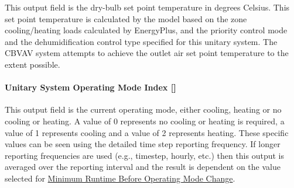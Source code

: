 This output field is the dry-bulb set point temperature in degrees Celsius. This set point temperature is calculated by the model based on the zone cooling/heating loads calculated by EnergyPlus, and the priority control mode and the dehumidification control type specified for this unitary system. The CBVAV system attempts to achieve the outlet air set point temperature to the extent possible.

\paragraph{Unitary System Operating Mode Index {[]}}\label{unitary-system-operating-mode-index}

This output field is the current operating mode, either cooling, heating or no cooling or heating.  A value of 0 represents no cooling or heating is required, a value of 1 represents cooling and a value of 2 represents heating. These specific values can be seen using the detailed time step reporting frequency. If longer reporting frequencies are used (e.g., timestep, hourly, etc.) then this output is averaged over the reporting interval and the result is dependent on the value selected for \hyperref[minimum-runtime-before-operating-mode-change]{Minimum Runtime Before Operating Mode Change}.